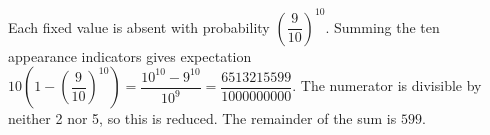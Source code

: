Each fixed value is absent with probability $(\dfrac{9}{10})^{10}$. Summing the ten appearance indicators gives expectation $10(1-(\dfrac{9}{10})^{10})=\dfrac{10^{10}-9^{10}}{10^9}=\dfrac{6513215599}{1000000000}$. The numerator is divisible by neither 2 nor 5, so this is reduced. The remainder of the sum is $\boxed{599}$.
